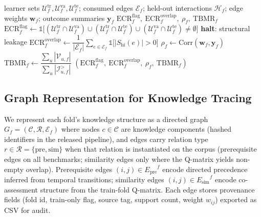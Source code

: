 \documentclass[pdflatex,sn-mathphys-num]{sn-jnl}
\newcommand{\Epre}{\ensuremath{E_{\text{pre}}}}
\newcommand{\Esim}{\ensuremath{E_{\text{sim}}}}
\newcommand{\KCs}{knowledge components}
\begin{document}
\begin{algorithm}[t]
\caption{Edge-provenance leakage audit for fold $f$}
\label{alg:leak-audit}
\begin{algorithmic}[1]
\Require learner sets $\mathcal{U}^{\mathrm{tr}}_f,\mathcal{U}^{\mathrm{va}}_f,\mathcal{U}^{\mathrm{te}}_f$;
  consumed edges $\mathcal{E}_f$; held-out interactions $\mathcal{H}_f$;
  edge weights $\mathbf{w}_f$; outcome summaries $\mathbf{y}_f$
\Ensure $\mathrm{ECR}^{\mathrm{flag}}_f,\ \mathrm{ECR}^{\mathrm{overlap}}_f,\ \rho_f,\ \mathrm{TBMR}_f$
\State $\mathrm{ECR}^{\mathrm{flag}}_f \gets \mathbb{1}\big[(\mathcal{U}^{\mathrm{tr}}_f\cap\mathcal{U}^{\mathrm{va}}_f)\cup(\mathcal{U}^{\mathrm{tr}}_f\cap\mathcal{U}^{\mathrm{te}}_f)\cup(\mathcal{U}^{\mathrm{va}}_f\cap\mathcal{U}^{\mathrm{te}}_f)\neq\emptyset\big]$
 \State \textbf{halt}: structural leakage \EndIf
\State $\mathrm{ECR}^{\mathrm{overlap}}_f \gets \dfrac{1}{|\mathcal{E}_f|}\sum_{e\in\mathcal{E}_f}\mathbb{1}\big[|S_{\text{hi}}(e)|>0\big]$ 
\State $\rho_f \gets \mathrm{Corr}(\mathbf{w}_f,\mathbf{y}_f)$ 
\State $\mathrm{TBMR}_f \gets \dfrac{\sum_u |\mathcal{V}_{u,f}|}{\sum_u |\mathcal{I}^{>}_{u,f}|}$ 
\State \Return $(\mathrm{ECR}^{\mathrm{flag}}_f,\ \mathrm{ECR}^{\mathrm{overlap}}_f,\ \rho_f,\ \mathrm{TBMR}_f)$
\end{algorithmic}
\end{algorithm}

\subsection{Graph Representation for Knowledge Tracing}
\label{sec:graph-repr}
We represent each fold's knowledge structure as a directed graph
$G_f=(\mathcal{C},\mathcal{R},\mathcal{E}_f)$ where nodes $c\in\mathcal{C}$
are \KCs{} (hashed identifiers in the released pipeline), and edges carry
relation type $r\in\mathcal{R}=\{\text{pre}, \text{sim}\}$ when that
relation is instantiated on the corpus (prerequisite edges on all benchmarks;
similarity edges only where the Q-matrix yields non-empty overlap). Prerequisite edges $(i,j)\in\Epre^f$ encode directed
precedence inferred from temporal transitions; similarity edges
$(i,j)\in\Esim^f$ encode co-assessment structure from the train-fold
Q-matrix. Each edge stores provenance fields (fold id, train-only flag,
source tag, support count, weight $w_{ij}$) exported as CSV for audit.
\end{document}
